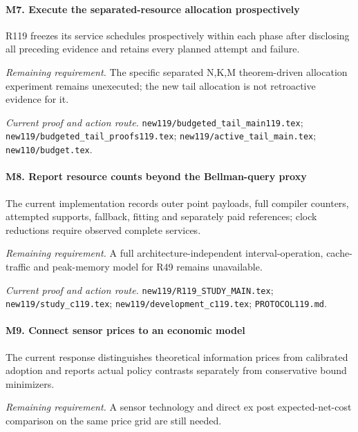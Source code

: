 \paragraph{M7. Execute the separated-resource allocation prospectively}

R119 freezes its service schedules prospectively within each phase after disclosing all preceding evidence and retains every planned attempt and failure.

\par\emph{Remaining requirement.} The specific separated N,K,M theorem-driven allocation experiment remains unexecuted; the new tail allocation is not retroactive evidence for it.

\par\emph{Current proof and action route.} \nolinkurl{new119/budgeted_tail_main119.tex}; \nolinkurl{new119/budgeted_tail_proofs119.tex}; \nolinkurl{new119/active_tail_main.tex}; \nolinkurl{new110/budget.tex}.

\paragraph{M8. Report resource counts beyond the Bellman-query proxy}

The current implementation records outer point payloads, full compiler counters, attempted supports, fallback, fitting and separately paid references; clock reductions require observed complete services.

\par\emph{Remaining requirement.} A full architecture-independent interval-operation, cache-traffic and peak-memory model for R49 remains unavailable.

\par\emph{Current proof and action route.} \nolinkurl{new119/R119_STUDY_MAIN.tex}; \nolinkurl{new119/study_c119.tex}; \nolinkurl{new119/development_c119.tex}; \nolinkurl{PROTOCOL119.md}.

\paragraph{M9. Connect sensor prices to an economic model}

The current response distinguishes theoretical information prices from calibrated adoption and reports actual policy contrasts separately from conservative bound minimizers.

\par\emph{Remaining requirement.} A sensor technology and direct ex post expected-net-cost comparison on the same price grid are still needed.

